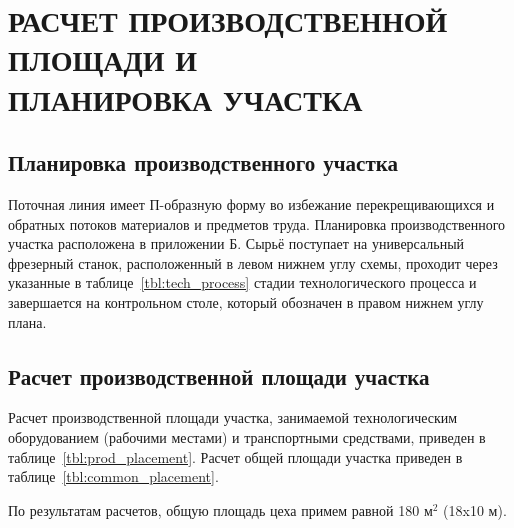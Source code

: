 \section[%
Расчет производственной площади и планировка участка]{%
РАСЧЕТ ПРОИЗВОДСТВЕННОЙ ПЛОЩАДИ И \\
ПЛАНИРОВКА УЧАСТКА
}
\label{sec:placement}

\subsection{Планировка производственного участка}

Поточная линия имеет П-образную форму во избежание перекрещивающихся и
обратных потоков материалов и предметов труда.
Планировка производственного участка расположена в приложении Б.
Сырьё поступает на универсальный фрезерный станок, 
расположенный в  левом нижнем углу схемы, 
проходит через указанные в таблице~\ref{tbl:tech_process} стадии
технологического процесса и завершается на контрольном столе,
который обозначен в правом нижнем углу плана.

\subsection{Расчет производственной площади участка}

Расчет производственной площади участка, занимаемой технологическим оборудованием
(рабочими местами) и транспортными средствами, 
приведен в таблице~\ref{tbl:prod_placement}.
Расчет общей площади участка приведен в таблице~\ref{tbl:common_placement}.

По результатам расчетов, общую площадь цеха примем равной
180 \( \text{м}^2 \) (18x10 м).

